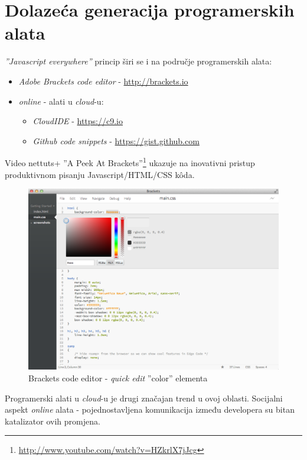 \documentclass[times, utf8, seminar]{fit}
\begin{document}
\section{Dolazeća generacija programerskih alata}

\emph{''Javascript everywhere''} princip širi se i na područje programerskih alata:
\begin{itemize}
   \item \emph{Adobe Brackets code editor} - \url{http://brackets.io}
   \item \emph{online} - alati u \emph{cloud}-u:
   \begin{itemize}
     \item \emph{CloudIDE} - \url{https://c9.io}
     \item \emph{Github code snippets} - \url{https://gist.github.com}
   \end{itemize}
\end{itemize}

Video nettuts+ ''A Peek At Brackets''\footnote{\url{http://www.youtube.com/watch?v=HZkrlX7jJcg}} ukazuje na inovativni pristup produktivnom pisanju Javascript/HTML/CSS k\^oda.

\begin{figure}[H]
\centering
\includegraphics[width=15cm]{img/brackets_color_edit.png}
\caption{Brackets code editor - \emph{quick edit} ''color'' elementa}
\end{figure}

Programerski alati u \emph{cloud}-u je drugi značajan trend u ovoj oblasti. Socijalni aspekt \emph{online} alata - pojednostavljena komunikacija između developera su bitan katalizator ovih promjena.
\end{document}
